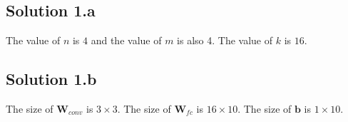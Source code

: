 \subsection*{Solution 1.a}
The value of $n$ is $4$ and the value of $m$ is also 4. The value of $k$ is $16$.
\subsection*{Solution 1.b}
The size of $\boldsymbol{W}_{conv}$ is $3\times 3$. The size of $\boldsymbol{W}_{fc}$ is $16 \times 10$. The size of $\boldsymbol{b}$ is $1\times 10$.